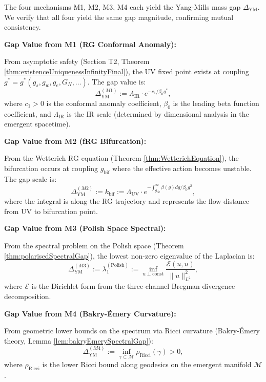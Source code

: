 \begin{theorem}
\label{thm:gapConsistency}

The four mechanisms M1, M2, M3, M4 each yield the Yang-Mills mass gap $\Delta_{\mathrm{YM}}$. We verify that all four yield the same gap magnitude, confirming mutual consistency.

\textbf{Gap Value from M1 (RG Conformal Anomaly):}

From asymptotic safety (Section T2, Theorem \ref{thm:existenceUniquenessInfinityFinal}), the UV fixed point exists at coupling $g^* = g^*(g_s, g_w, g_e, G_N, \ldots)$. The gap value is:
\begin{equation}
\Delta_{\mathrm{YM}}^{(M1)} := \Lambda_{\mathrm{IR}} \cdot e^{-c_1 / \beta_0 g^*},
\end{equation}
where $c_1 > 0$ is the conformal anomaly coefficient, $\beta_0$ is the leading beta function coefficient, and $\Lambda_{\mathrm{IR}}$ is the IR scale (determined by dimensional analysis in the emergent spacetime).

\textbf{Gap Value from M2 (fRG Bifurcation):}

From the Wetterich RG equation (Theorem \ref{thm:WetterichEquation}), the bifurcation occurs at coupling $g_{\mathrm{bif}}$ where the effective action becomes unstable. The gap scale is:
\begin{equation}
\Delta_{\mathrm{YM}}^{(M2)} := k_{\mathrm{bif}} := \Lambda_{\mathrm{UV}} \cdot e^{-\int_{g_{\mathrm{bif}}}^{\infty} \beta(g) dg / \beta_0 g^2},
\end{equation}
where the integral is along the RG trajectory and represents the flow distance from UV to bifurcation point.

\textbf{Gap Value from M3 (Polish Space Spectral):}

From the spectral problem on the Polish space (Theorem \ref{thm:polarisedSpectralGap}), the lowest non-zero eigenvalue of the Laplacian is:
\begin{equation}
\Delta_{\mathrm{YM}}^{(M3)} := \lambda_1^{(\text{Polish})} := \inf_{u \perp \text{const}} \frac{\mathcal{E}(u, u)}{\|u\|_{L^2}^2},
\end{equation}
where $\mathcal{E}$ is the Dirichlet form from the three-channel Bregman divergence decomposition.

\textbf{Gap Value from M4 (Bakry-Émery Curvature):}

From geometric lower bounds on the spectrum via Ricci curvature (Bakry-Émery theory, Lemma \ref{lem:bakryEmerySpectralGap}):
\begin{equation}
\Delta_{\mathrm{YM}}^{(M4)} := \inf_{\gamma \subset \mathcal{M}} \rho_{\mathrm{Ricci}}(\gamma) > 0,
\end{equation}
where $\rho_{\mathrm{Ricci}}$ is the lower Ricci bound along geodesics on the emergent manifold $\mathcal{M}$.


\end{theorem}
